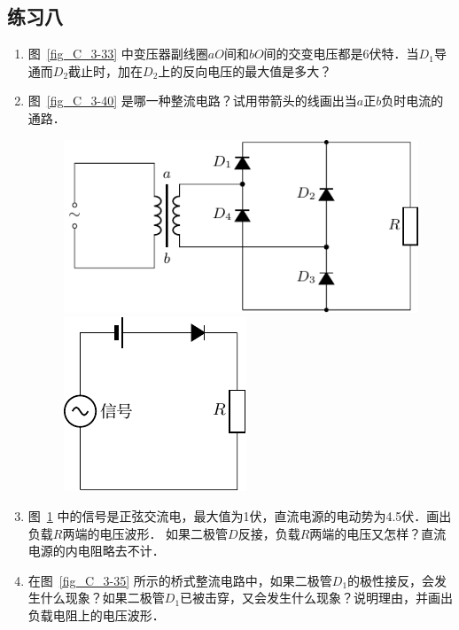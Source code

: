 \subsection*{练习八}
\begin{enumerate}
	\item 图~\ref{fig_C_3-33} 中变压器副线圈$aO$间和$bO$间的交变电压都是6伏特．当$D_1$导通而$D_2$截止时，加在$D_2$上的反向电压的最大值是多大？
	\item 图~\ref{fig_C_3-40} 是哪一种整流电路？试用带箭头的线画出当$a$正$b$负时电流的通路．
	\begin{figure}[htbp]
		\centering
		\begin{minipage}[b]{0.58\linewidth}
			\centering
			\includegraphics{fig/C/3-40.pdf}
			\caption{}\label{fig_C_3-40}
		\end{minipage}
		\begin{minipage}[b]{0.4\linewidth}
			\centering
			\includegraphics{fig/C/3-41.pdf}
			\caption{}\label{fig_C_3-41}
		\end{minipage}
	\end{figure}
	
	
	\item 图~\ref{fig_C_3-41} 中的信号是正弦交流电，最大值为1伏，直流电源的电动势为4.5伏．画出负载$R$两端的电压波形．
	如果二极管$D$反接，负载$R$两端的电压又怎样？直流电源的内电阻略去不计．
	\item 在图~\ref{fig_C_3-35} 所示的桥式整流电路中，如果二极管$D_1$的极性接反，会发生什么现象？如果二极管$D_1$已被击穿，又会发生什么现象？说明理由，并画出负载电阻上的电压波形．
\end{enumerate}

